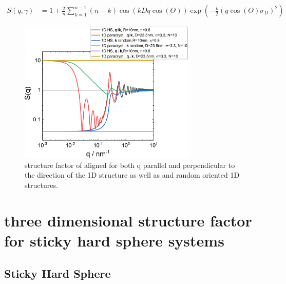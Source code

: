 \begin{align}\label{eq:SQ1D_paracrystal}
  S(q,\gamma) &=  1+\frac{2}{n} \sum_{k=1}^{n-1} (n-k)
\cos(kDq\cos(\Theta))
     \exp\left(-\frac{k}{2}\left(q\cos(\Theta) \sigma_D\right)^2\right)
\end{align}

\begin{figure}[htb]
\begin{center}
\includegraphics[width=0.75\textwidth]{../images/structure_factor/SQ_1D_2D/SQ_1D.png}
\end{center}
\caption{structure factor of aligned for both q parallel and perpendicular to the direction of the 1D structure as well as and random oriented 1D structures.}
\label{fig:1DSQ}
\end{figure}

\clearpage
\section{three dimensional structure factor for sticky hard sphere systems} \hspace{1pt}
\label{sec:sHS}

\subsection{Sticky Hard Sphere} ~\\

